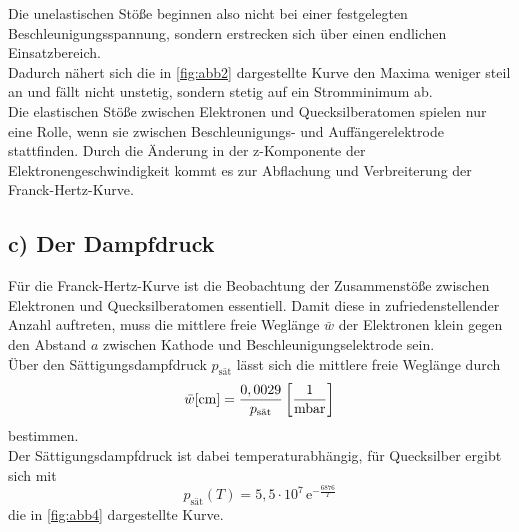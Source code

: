 Die unelastischen Stöße beginnen also nicht bei einer festgelegten Beschleunigungsspannung, sondern erstrecken
sich über einen endlichen Einsatzbereich. \\

Dadurch nähert sich die in \autoref{fig:abb2} dargestellte Kurve den Maxima weniger steil an und fällt nicht
unstetig, sondern stetig auf ein Stromminimum ab. \\

Die elastischen Stöße zwischen Elektronen und Quecksilberatomen spielen nur eine Rolle, wenn sie zwischen
Beschleunigungs- und Auffängerelektrode stattfinden.
Durch die Änderung in der z-Komponente der Elektronengeschwindigkeit kommt es zur Abflachung und Verbreiterung
der Franck-Hertz-Kurve.


\subsection*{c) Der Dampfdruck}

Für die Franck-Hertz-Kurve ist die Beobachtung der Zusammenstöße zwischen Elektronen und Quecksilberatomen
essentiell.
Damit diese in zufriedenstellender Anzahl auftreten, muss die mittlere freie Weglänge $\bar{w}$ der Elektronen
klein gegen den Abstand $a$ zwischen Kathode und Beschleunigungselektrode sein. \\

Über den Sättigungsdampfdruck $p_\text{sät}$ lässt sich die mittlere freie Weglänge durch
\begin{equation}
    \bar{w} [\unit{\centi\meter}] = \frac{0,0029}{p_\text{sät}} \left[\unit{\frac{1}{\milli\bar}} \right]
    \label{eq:mittfreiweg}
\end{equation}
bestimmen. \\

Der Sättigungsdampfdruck ist dabei temperaturabhängig, für Quecksilber ergibt sich mit
\begin{equation*}
    p_\text{sät} (T) = 5,5 \cdot 10^7 \,\text{e}^{-\frac{6876}{T}}
    \label{eq:dampfdruck}
\end{equation*}
die in \autoref{fig:abb4} dargestellte Kurve.

